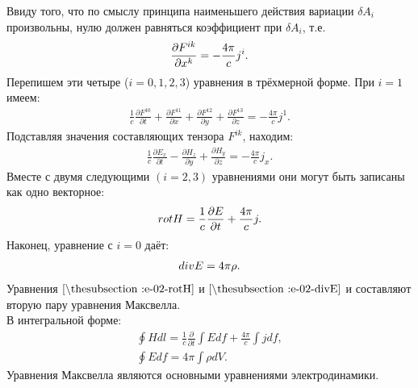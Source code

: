 \documentclass[__main__.tex]{subfiles}
\begin{document}
Ввиду того, что по смыслу принципа наименьшего действия вариации $\delta A_i$ произвольны, нулю должен равняться коэффициент при $\delta A_i$, т.е.
\begin{gather}
	\llabel{e-02-deltaF}
	\frac{\partial F^{ik}}{\partial x^k} = -\frac{4\pi}{c}j^i.
\end{gather}
Перепишем эти четыре ($i = 0, 1, 2, 3$) уравнения в трёхмерной форме. При $i=1$ имеем:
\begin{gather*}
	\frac{1}{c}\frac{\partial F^{10}}{\partial t} + \frac{\partial F^{11}}{\partial x} + \frac{\partial F^{12}}{\partial y} + \frac{\partial F^{13}}{\partial z} = -\frac{4\pi}{c}j^1.
\end{gather*}
Подставляя значения составляющих тензора $F^{ik}$, находим:
\begin{gather*}
	\frac{1}{c}\frac{\partial E_x}{\partial t} - \frac{\partial H_z}{\partial y} + \frac{\partial H_y}{\partial z} = -\frac{4\pi}{c}j_x.
\end{gather*}
Вместе с двумя следующими $(i = 2, 3)$ уравнениями они могут быть записаны как одно векторное:
\begin{gather}
	\llabel{e-02-rotH}
	rot H = \frac{1}{c}\frac{\partial E}{\partial t} + \frac{4\pi}{c}j.
\end{gather}
Наконец, уравнение с $i=0$ даёт:
\begin{gather}
\llabel{e-02-divE}
	div E = 4\pi\rho.
\end{gather}
Уравнения $\lref{e-02-rotH}$ и $\lref{e-02-divE}$ и составляют вторую пару уравнения Максвелла.\\
В интегральной форме:\\
\begin{gather*}
	\oint Hdl = \frac{1}{c}\frac{\partial}{\partial t}\int Edf + \frac{4\pi}{c}\int jdf,\\
	\oint Edf = 4\pi\int \rho dV.
\end{gather*}
 Уравнения Максвелла являются основными уравнениями электродинамики.\\
\end{document}
